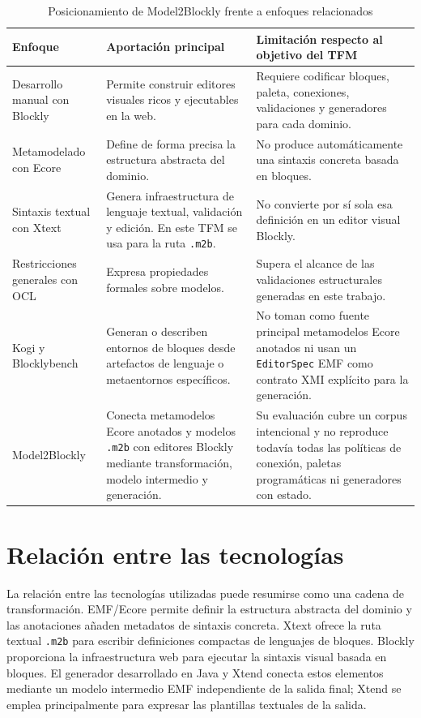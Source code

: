 \begin{table}[h]
  \centering
  \small
  \begin{tabular}{|L{0.24\textwidth}|L{0.30\textwidth}|L{0.34\textwidth}|}
    \hline
    Enfoque & Aportación principal & Limitación respecto al objetivo del TFM \\
    \hline
    Desarrollo manual con Blockly & Permite construir editores visuales ricos y
    ejecutables en la web. & Requiere codificar bloques, paleta, conexiones,
    validaciones y generadores para cada dominio. \\
    Metamodelado con Ecore & Define de forma precisa la estructura abstracta del
    dominio. & No produce automáticamente una sintaxis concreta basada en
    bloques. \\
    Sintaxis textual con Xtext & Genera infraestructura de lenguaje textual,
    validación y edición. En este TFM se usa para la ruta \texttt{.m2b}. &
    No convierte por sí sola esa definición en un editor visual Blockly. \\
	    Restricciones generales con OCL & Expresa propiedades formales sobre modelos.
	    & Supera el alcance de las validaciones estructurales generadas en este
	    trabajo. \\
    Kogi y Blocklybench & Generan o describen entornos de bloques desde
    artefactos de lenguaje o metaentornos específicos. & No toman como fuente
    principal metamodelos Ecore anotados ni usan un \texttt{EditorSpec} EMF como
    contrato XMI explícito para la generación. \\
	    Model2Blockly & Conecta metamodelos Ecore anotados y modelos
	    \texttt{.m2b} con editores Blockly mediante transformación, modelo
	    intermedio y generación. & Su evaluación cubre un corpus intencional y no
    reproduce todavía todas las políticas de conexión, paletas programáticas ni
    generadores con estado. \\
    \hline
  \end{tabular}
  \caption{Posicionamiento de Model2Blockly frente a enfoques relacionados}
  \label{tab:comparacion-enfoques}
\end{table}

\section{Relación entre las tecnologías}
\label{sec:relacion-tecnologias}

La relación entre las tecnologías utilizadas puede resumirse como una cadena de
transformación. EMF/Ecore permite definir la estructura abstracta del dominio y
las anotaciones añaden metadatos de sintaxis concreta. Xtext ofrece la ruta
textual \texttt{.m2b} para escribir definiciones compactas de lenguajes de
bloques. Blockly proporciona la
infraestructura web para ejecutar la sintaxis visual basada en bloques. El
generador desarrollado en Java y Xtend conecta estos elementos mediante un
modelo intermedio EMF independiente de la salida final; Xtend se emplea
principalmente para expresar las plantillas textuales de la salida.

